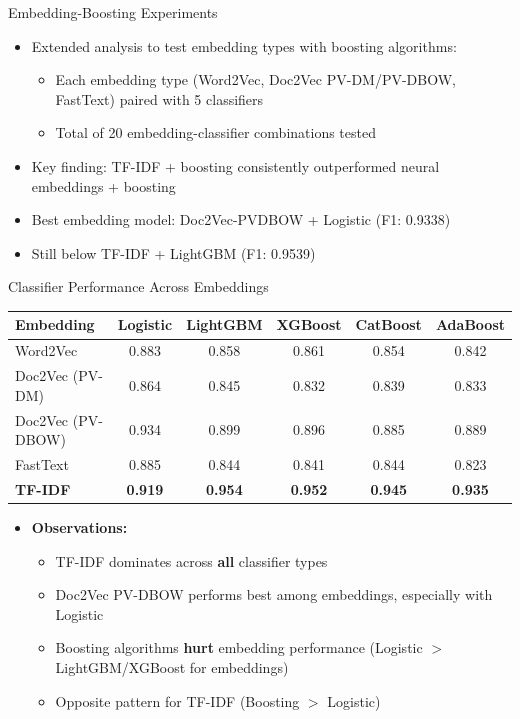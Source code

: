 \documentclass[
    10pt,
    aspectratio=169,
]{beamer}
\begin{document}

\begin{frame}{Embedding-Boosting Experiments}
\begin{itemize}
    \item Extended analysis to test embedding types with boosting algorithms:
    \begin{itemize}
        \item Each embedding type (Word2Vec, Doc2Vec PV-DM/PV-DBOW, FastText) paired with 5 classifiers
        \item Total of 20 embedding-classifier combinations tested
    \end{itemize}
    \item Key finding: TF-IDF + boosting consistently outperformed neural embeddings + boosting
    \item Best embedding model: Doc2Vec-PVDBOW + Logistic (F1: 0.9338)
    \item Still below TF-IDF + LightGBM (F1: 0.9539)
\end{itemize}
\end{frame}

\begin{frame}{Classifier Performance Across Embeddings}
\begin{table}[]
\centering
\small
\begin{tabular}{|l|c|c|c|c|c|}
\hline
\textbf{Embedding} & \textbf{Logistic} & \textbf{LightGBM} & \textbf{XGBoost} & \textbf{CatBoost} & \textbf{AdaBoost} \\ \hline
Word2Vec & 0.883 & 0.858 & 0.861 & 0.854 & 0.842 \\ \hline
Doc2Vec (PV-DM) & 0.864 & 0.845 & 0.832 & 0.839 & 0.833 \\ \hline
Doc2Vec (PV-DBOW) & \cellcolor[HTML]{90EE90}0.934 & 0.899 & 0.896 & 0.885 & 0.889 \\ \hline
FastText & 0.885 & 0.844 & 0.841 & 0.844 & 0.823 \\ \hline
\rowcolor[HTML]{FFD700}
\textbf{TF-IDF} & \textbf{0.919} & \textbf{0.954} & \textbf{0.952} & \textbf{0.945} & \textbf{0.935} \\ \hline
\end{tabular}
\end{table}
\vspace{0.2cm}
\begin{itemize}
    \item \textbf{Observations:}
    \begin{itemize}
        \item TF-IDF dominates across \textbf{all} classifier types
        \item Doc2Vec PV-DBOW performs best among embeddings, especially with Logistic
        \item Boosting algorithms \textbf{hurt} embedding performance (Logistic $>$ LightGBM/XGBoost for embeddings)
        \item Opposite pattern for TF-IDF (Boosting $>$ Logistic)
    \end{itemize}
\end{itemize}
\end{frame}
\end{document}
